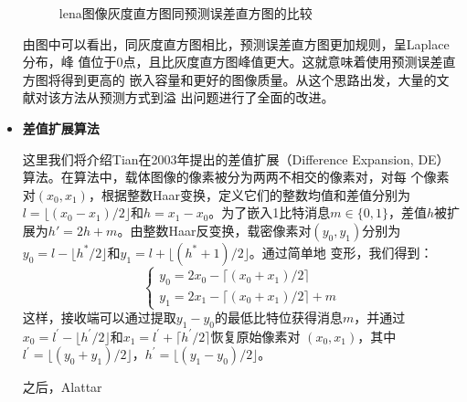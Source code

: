 \begin{itemize}
\begin{figure}[!hbt]
{      \label{fig:lena_hist}}
    \caption{lena图像灰度直方图同预测误差直方图的比较}
    \label{fig:lena_hist_compare}
    \end{figure}
    由图中可以看出，同灰度直方图相比，预测误差直方图更加规则，呈Laplace分布，峰
    值位于0点，且比灰度直方图峰值更大。这就意味着使用预测误差直方图将得到更高的
    嵌入容量和更好的图像质量。从这个思路出发，大量的文献对该方法从预测方式到溢
    出问题进行了全面的改进。
  \vspace{-3.5mm}
  \item \textbf{差值扩展算法}
    \vspace{-2mm}
    \par
    这里我们将介绍Tian\cite{tian2003reversible}在2003年提出的差值扩展（Difference
    Expansion, DE）算法。在算法中，载体图像的像素被分为两两不相交的像素对，对每
    个像素对$(x_0, x_1)$，根据整数Haar变换，定义它们的整数均值和差值分别为
    $l=\lfloor (x_0-x_1)/2 \rfloor$和$h=x_1-x_0$。为了嵌入1比特消息$m \in \{0,
    1\}$，差值$h$被扩展为$h'=2h+m$。由整数Haar反变换，载密像素对$(y_0, y_1)$分别为
    $y_0=l-\lfloor h^*/2 \rfloor$和$y_1=l+\lfloor (h^*+1)/2 \rfloor$。通过简单地
    变形，我们得到：
    \begin{equation}
      \label{eq:de_marked_pair}
      \left\{ \begin{array}{l}
        y_0=2x_0-\lceil (x_0+x_1)/2 \rceil\\
        y_1=2x_1-\lceil (x_0+x_1)/2 \rceil+m
      \end{array} \right.
    \end{equation}
    这样，接收端可以通过提取$y_1-y_0$的最低比特位获得消息$m$，并通过$x_0=l^{'}-
    \lfloor h^{'}/2 \rfloor$和$x_1=l^{'}+\lceil h^{'}/2 \rceil$恢复原始像素对
    $(x_0, x_1)$，其中$l^{'}=\lfloor (y_0+y_1)/2 \rfloor$，$h^{'}=\lfloor (y_1-
    y_0)/2 \rfloor$。
    \par
    之后，Alattar\cite{alattar2003reversible,alattar2004reversible,
}
\end{itemize}
